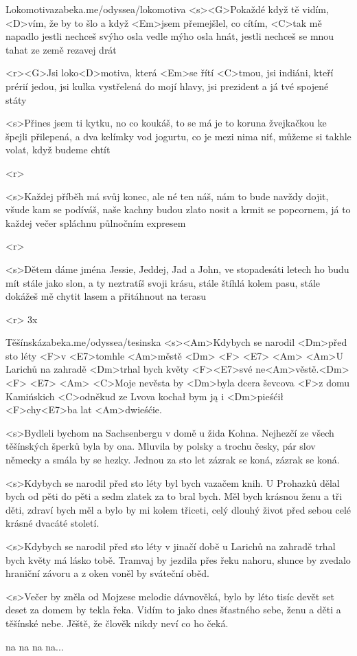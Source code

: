 \begin{song}[Poletíme?]{41}{Lokomotiva}{zabeka.me/odyssea/lokomotiva}
	<s><G>Pokaždé když tě vidím, <D>vím, že by to šlo
	a když <Em>jsem přemejšlel, co cítím, <C>tak mě napadlo
	jestli nechceš svýho osla vedle mýho osla hnát,
	jestli nechceš se mnou tahat ze země rezavej drát

	<r><G>Jsi loko<D>motiva, která <Em>se řítí <C>tmou,
	jsi indiáni, kteří prérií jedou,
	jsi kulka vystřelená do mojí hlavy,
	jsi prezident a já tvé spojené státy

	<s>Přines jsem ti kytku, no co koukáš, to se má
	je to koruna žvejkačkou ke špejli přilepená,
	a dva kelímky vod jogurtu, co je mezi nima niť,
	můžeme si takhle volat, když budeme chtít

	<r>

	<s>Každej příběh má svůj konec, ale né ten náš,
	nám to bude navždy dojit, všude kam se podíváš,
	naše kachny budou zlato nosit a krmit se popcornem,
	já to každej večer spláchnu půlnočním expresem

	<r>

	<s>Dětem dáme jména Jessie, Jeddej, Jad a John,
	ve stopadesáti letech ho budu mít stále jako slon,
	a ty neztratíš svoji krásu, stále štíhlá kolem pasu,
	stále dokážeš mě chytit lasem a přitáhnout na terasu

	<r>
	3x

\end{song}
\begin{song}{42}{Těšínská}{zabeka.me/odyssea/tesinska}
	<s><Am>Kdybych se narodil <Dm>před sto léty
	<F>v <E7>tomhle <Am>městě <Dm> <F> <E7> <Am>
	<Am>U Larichů na zahradě <Dm>trhal bych květy
	<F><E7>své ne<Am>věstě.<Dm> <F> <E7> <Am>
	<C>Moje nevěsta by <Dm>byla dcera ševcova
	<F>z domu Kamińskich <C>odněkud ze Lvova
	kochał bym ją i <Dm>pieśćił <F>chy<E7>ba lat <Am>dwieśćie.

	<s>Bydleli bychom na Sachsenbergu v domě u žida Kohna.
	Nejhezčí ze všech těšínských šperků byla by ona.
	Mluvila by polsky a trochu česky,
	pár slov německy a smála by se hezky.
	Jednou za sto let zázrak se koná, zázrak se koná.

	<s>Kdybych se narodil před sto léty byl bych vazačem knih.
	U Prohazků dělal bych od pěti do pěti a sedm zlatek za to bral bych.
	Měl bych krásnou ženu a tři děti,
	zdraví bych měl a bylo by mi kolem třiceti,
	celý dlouhý život před sebou celé krásné dvacáté století.

	<s>Kdybych se narodil před sto léty v jinačí době
	u Larichů na zahradě trhal bych květy má lásko tobě.
	Tramvaj by jezdila přes řeku nahoru,
	slunce by zvedalo hraniční závoru
	a z oken voněl by sváteční oběd.

	<s>Večer by zněla od Mojzese melodie dávnověká,
	bylo by léto tisíc devět set deset za domem by tekla řeka.
	Vidím to jako dnes šťastného sebe,
	ženu a děti a těšínské nebe.
	Jěště, že člověk nikdy neví co ho čeká.

	na na na na...

\end{song}
